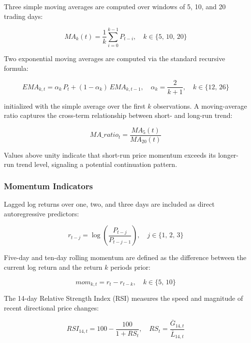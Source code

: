 \documentclass[12pt]{article}
\begin{document}
Three simple moving averages are computed over windows of 5, 10, and 20 trading days:

\begin{equation}
    MA_k(t) = \frac{1}{k}\sum_{i=0}^{k-1} P_{t-i}, \quad k \in \{5,\, 10,\, 20\}
\end{equation}

Two exponential moving averages are computed via the standard recursive formula:

\begin{equation}
    EMA_{k,t} = \alpha_k\, P_t + (1 - \alpha_k)\, EMA_{k,t-1}, \quad \alpha_k = \frac{2}{k+1}, \quad k \in \{12,\, 26\}
\end{equation}

initialized with the simple average over the first $k$ observations. A moving-average ratio captures the cross-term relationship between short- and long-run trend:

\begin{equation}
    MA\_ratio_t = \frac{MA_5(t)}{MA_{20}(t)}
\end{equation}

Values above unity indicate that short-run price momentum exceeds its longer-run trend level, signaling a potential continuation pattern.

\subsubsection*{Momentum Indicators}

Lagged log returns over one, two, and three days are included as direct autoregressive predictors:

\begin{equation}
    r_{t-j} = \log\!\left(\frac{P_{t-j}}{P_{t-j-1}}\right), \quad j \in \{1,\, 2,\, 3\}
\end{equation}

Five-day and ten-day rolling momentum are defined as the difference between the current log return and the return $k$ periods prior:

\begin{equation}
    mom_{k,t} = r_t - r_{t-k}, \quad k \in \{5,\, 10\}
\end{equation}

The 14-day Relative Strength Index (RSI) measures the speed and magnitude of recent directional price changes:

\begin{equation}
    RSI_{14,t} = 100 - \frac{100}{1 + RS_t}, \quad RS_t = \frac{\overline{G}_{14,t}}{\overline{L}_{14,t}}
\end{equation}
\end{document}
